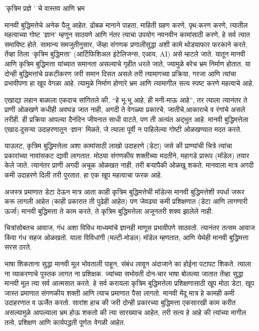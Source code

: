 'कृत्रिम प्रज्ञे ' चे वास्तव आणि भ्रम

मानवी बुद्धिमत्तेचे अनेक पैलू आहेत. ढोबळ मानाने पाहता, माहिती ग्रहण करणे, पृथ:करण करणे, त्यातील महत्वाच्या गोष्ट 'ज्ञान' म्हणून साठवणे आणि नंतर त्याचा उपयोग नवनवीन कामांसाठी करणे, हे सर्व त्यात समाविष्ट होते. सामान्य समजुतीनुसार, जेंव्हा संगणक प्रणालीसुद्धा अशी कामे थोड्याफार फरकाने करते, तेंव्हा तिला ‘कृत्रिम बुद्धिमत्ता’ (आर्टिफिशिअल इंटेलिजन्स, एआय, AI) असे म्हटले जाते. यातून मानवी आणि कृत्रिम बुद्धिमत्ता यांच्यात समानता असल्याचे गृहीत धरले जाते, ज्यामुळे बरेच भ्रम निर्माण होतात. या दोन्ही बुद्धिमत्तांचे प्रकटीकरण जरी समान दिसत असले तरी त्यामागच्या प्रक्रिया, गरजा आणि त्यांचा प्रभावीपणा हा खूप वेगळा आहे. त्यामुळे निर्माण होणारे भ्रम आणि त्यामागील सत्य स्पष्ट करणे महत्वाचे आहे.

एखाद्या लहान बाळाला एकदाच सांगितले की, “हे भू-भू आहे, ही मनी-माऊ आहे”, तर त्याला त्यानंतर ते प्राणी ओळखणे कधीही अवघड जात नाही, अगदी ते वेगळ्या प्रकारचे, जातीचे,आकाराचे व रंगांचे असले तरीही. ही प्रक्रिया आपल्या दैनंदिन जीवनात साधी वाटते, पण ती अत्यंत अद्भुत आहे. मानवी बुद्धिमत्तेला एखाद-दुसऱ्या उदाहरणातून ‘ज्ञान’ मिळते, जे त्याला पूर्वी न पाहिलेल्या गोष्टी ओळखण्यात मदत करते.

याउलट, कृत्रिम बुद्धिमत्तेला अशा कामांसाठी लाखो उदाहरणे (डेटा) जसे की प्राण्यांची चित्रे त्यांचा प्रकारांच्या नावांसकट द्यावी लागतात. मोठ्या संगणकीय शक्तीच्या मदतीने, महागडे प्रारूप (मॉडेल) तयार केले जाते. त्यानंतर प्राणी अगदी अचूक ओळखत नाही, तरी बऱ्यापैकी ओळखू शकते. मानवाला मात्र अगदी कमी उदाहरणे दिली तरी पुरतात. हा एक खूप महत्वाचा फरक आहे. 

अजस्त्र प्रमाणात डेटा देऊन मात्र आता काही कृत्रिम बुद्धिमत्तेची मॉडेल्स मानवी बुद्धिमत्तेशी स्पर्धा जरूर करू लागली आहेत (काही प्रकारात ती पुढेही आहेत) पण जेवढ्या कमी प्रशिक्षणात (डेटा आणि लागणारी ऊर्जा) मानवी बुद्धिमत्ता ते काम करते, ते कृत्रिम बुद्धिमत्तेला अजूनतरी शक्य झालेले नाही. 

चित्रांसोबतच आवाज, गंध अशा विविध माध्यमांचे ज्ञानही माणूस प्रभावीपणे साठवतो. त्यानंतर तत्सम आवाज किंवा गंध सहज ओळखतो. याला विविधांगी (मल्टी-मोडल) मॉडेल म्हणतात, आणि येथेही मानवी बुद्धिमत्ता सरस ठरते.

भाषा शिकताना सुद्धा मानवी मूल भोवताली पाहून, संबंध लावून अंदाजाने का होईना पटापट शिकते. त्याला ना व्याकरणाचे पुस्तक लागत ना प्रशिक्षक. ज्यांच्या सभोवती दोन-चार भाषा बोलल्या जातात तेंव्हा सुद्धा मानवी मूल त्या सर्व आत्मसात करते. हे सर्व करायला कृत्रिम बुद्धिमत्तेला प्रशिक्षणासाठी खूप मोठा डेटा, खूप जास्त प्रमाणात संगणकीय शक्ती आणि त्याच प्रमाणात पैसा लागतो. मानवी मेंदू मात्र हे कामही कमी उदाहरणात व ऊर्जेत करतो. सारांश हाच की  जरी दोन्ही प्रकारच्या बुद्धिमत्ता एकसारखी काम करीत असल्यामुळे आपल्याला भ्रम होऊ शकतो की त्या सारख्याच आहेत, तरी सत्य हे आहे की त्यांच्या मागील तत्वे, प्रशिक्षण आणि कार्यपद्धती पूर्णतः वेगळी आहेत. 

